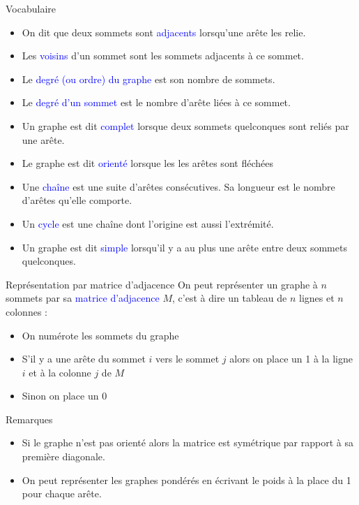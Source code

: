 \documentclass[10pt]{beamer}
\begin{document}
\begin{frame}
	\mframe{\GR}
	\begin{block}{Vocabulaire}
		\begin{itemize}[label=\textbullet]
			\item<1-> On dit que deux sommets sont \textcolor{blue}{adjacents} lorsqu'une arête les relie. 			\item<2-> Les \textcolor{blue}{voisins} d'un sommet sont les sommets adjacents à ce sommet.
			\item<3-> Le \textcolor{blue}{degré (ou ordre) du graphe} est son nombre de sommets.
			\item<4-> Le \textcolor{blue}{degré d'un sommet} est le nombre d'arête liées à ce sommet.
			\item<5-> Un graphe est dit \textcolor{blue}{complet} lorsque deux sommets quelconques sont reliés par une arête.
			\item<6-> Le graphe est dit \textcolor{blue}{orienté} lorsque les \og les arêtes sont fléchées \fg
			\item<7-> Une \textcolor{blue}{chaîne} est une suite d'arêtes consécutives. Sa longueur est le nombre d'arêtes qu'elle comporte.
			\item<8-> Un \textcolor{blue}{cycle} est une chaîne dont l'origine est aussi l'extrémité.
			\item<9-> Un graphe est dit \textcolor{blue}{simple} lorsqu'il y a au plus une arête entre deux sommets quelconques.
		\end{itemize}
	\end{block}
\end{frame}


\begin{frame}
	\mframe{\GR}
	\begin{alertblock}{Représentation par matrice d'adjacence}
		On peut représenter un graphe à $n$ sommets par sa \textcolor{blue}{matrice d'adjacence} $M$, c'est à dire un tableau de $n$ lignes et $n$ colonnes :
		\begin{itemize}[label=\textbullet]
			\item<2-> On numérote les sommets du graphe
			\item<3-> S'il y a une arête du sommet $i$ vers le sommet $j$ alors on place un 1 à la ligne $i$ et à la colonne $j$ de $M$
			\item<4-> Sinon on place un 0
		\end{itemize}
	\end{alertblock}
	\begin{block}{Remarques}
		\begin{itemize}[label=\textbullet]
			\item<5-> Si le graphe n'est pas orienté alors la matrice est symétrique par rapport à sa première diagonale.
			\item<6-> On peut représenter les graphes pondérés en écrivant le poids à la place du 1 pour chaque arête.
		\end{itemize}
	\end{block}
\end{frame}
\end{document}
